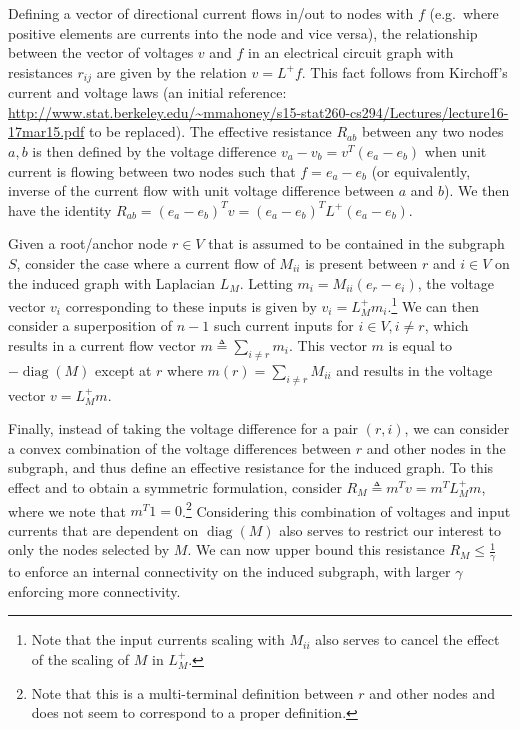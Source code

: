 \documentclass{article}
\begin{document}
Defining a vector of directional current flows in/out to nodes with $f$ (e.g.\ where positive elements are currents into the node and vice versa), the relationship between the vector of voltages $v$ and $f$ in an electrical circuit graph with resistances $r_{ij}$ are given by the relation $v = L^+ f$. This fact follows from Kirchoff's current and voltage laws (an initial reference: \url{http://www.stat.berkeley.edu/~mmahoney/s15-stat260-cs294/Lectures/lecture16-17mar15.pdf} to be replaced). The effective resistance $R_{ab}$ between any two nodes $a, b$ is then defined by the voltage difference $v_a - v_b = v^T (e_a - e_b)$ when unit current is flowing between two nodes such that $f = e_a - e_b$ (or equivalently, inverse of the current flow with unit voltage difference between $a$ and $b$). We then have the identity $R_{ab} = (e_a - e_b)^T v = (e_a - e_b)^T L^+ (e_a - e_b)$.

Given a root/anchor node $r \in V$ that is assumed to be contained in the subgraph $S$, consider the case where a current flow of $M_{ii}$ is present between $r$ and $i \in V$ on the induced graph with Laplacian $L_M$. Letting $m_i = M_{ii} (e_r - e_i)$, the voltage vector $v_i$ corresponding to these inputs is given by $v_i = L_M^+ m_i$.\footnote{Note that the input currents scaling with $M_{ii}$ also serves to cancel the effect of the scaling of $M$ in $L_M^+$.} We can then consider a superposition of $n-1$ such current inputs for $i \in V, i \neq r$, which results in a current flow vector $m \triangleq \sum_{i \neq r} m_i$. This vector $m$ is equal to $-\operatorname{diag}(M)$ except at $r$ where $m(r) = \sum_{i \neq r} M_{ii}$ and results in the voltage vector $v = L_M^+ m$.

Finally, instead of taking the voltage difference for a pair $(r, i)$, we can consider a convex combination of the voltage differences between $r$ and other nodes in the subgraph, and thus define an effective resistance for the induced graph. To this effect and to obtain a symmetric formulation, consider $R_M \triangleq m^T v = m^T L_M^+ m$, where we note that $m^T 1 = 0$.\footnote{Note that this is a multi-terminal definition between $r$ and other nodes and does not seem to correspond to a proper definition.} Considering this combination of voltages and input currents that are dependent on $\operatorname{diag}(M)$ also serves to restrict our interest to only the nodes selected by $M$. We can now upper bound this resistance $R_M \leq \frac{1}{\gamma}$ to enforce an internal connectivity on the induced subgraph, with larger $\gamma$ enforcing more connectivity.
\end{document}
